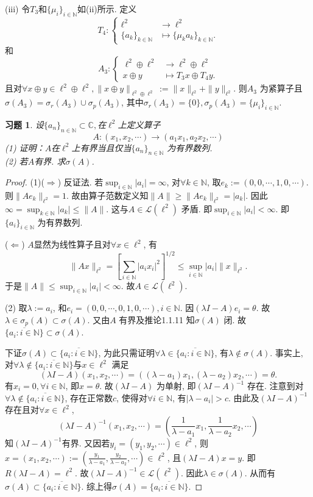 \documentclass[UTF8,twoside]{ctexbook}
\newtheorem{exercise}{习题}[section]
\newcommand{\h}{\mathscr}
\newcommand{\kx}{\mathbb}
\numberwithin{equation}{section}
\begin{document}
	(iii) 令$T_3$和$\{\mu_i\}_{i\in\kx N}$如(ii)所示. 定义
	\[
	T_4:\left\{
	\begin{aligned}
	\ell^2&\rightarrow\ell^2\\
	\{a_k\}_{k\in\kx N}&\mapsto\{\mu_k a_k\}_{k\in\kx N}.
	\end{aligned}
	\right.
	\]
	和
	\[
	A_3:\left\{
	\begin{aligned}
	\ell^2\oplus\ell^2&\rightarrow\ell^2\oplus\ell^2\\
	x\oplus y&\mapsto T_3 x\oplus T_4 y.
	\end{aligned}
	\right.
	\]
	且对$\forall x\oplus y\in\ell^2\oplus\ell^2, \|x\oplus y\|_{\ell^2\oplus\ell^2}:=\|x\|_{\ell^2}+\|y\|_{\ell^2}$. 则$A_3$ 为紧算子且$\sigma(A_3)=\sigma_r(A_3)\cup\sigma_p(A_3)$, 其中$\sigma_r(A_3)=\{0\}, \sigma_p(A_3)=\{\mu_i\}_{i\in\kx N}.$
	\begin{exercise}
		设$\{a_n\}_{n\in\kx N}\subset\kx C,$在$\ell^2$上定义算子
		\[
		A : (x_1,x_2,\cdots)\rightarrow(a_1 x_1,a_2 x_2,\cdots)
		\]
		(1) 证明：$A$在$\ell^2$上有界当且仅当$\{a_n\}_{n\in\kx N}$ 为有界数列.\\
		(2) 若$A$有界. 求$\sigma(A)$.
	\end{exercise}
	\begin{proof}
		(1)($\Rightarrow$) 反证法. 若$\sup_{i\in\kx N}|a_i|=\infty$, 对$\forall k\in\kx N$, 取$e_k:=(0,0,\cdots,1,0,\cdots)$. 则$\|Ae_k\|_{\ell^2}=1$. 故由算子范数定义知$\|A\|\geq\|Ae_k\|_{\ell^2}=|a_k|$. 因此$\infty=\sup_{k\in\kx N}|a_k|\leq\|A\|$. 这与$A\in\h L(\ell^2)$ 矛盾. 即$\sup_{i\in\kx N}|a_i|<\infty$. 即$\{a_i\}_{i\in\kx N}$ 为有界数列.

		($\Leftarrow$) $A$显然为线性算子且对$\forall x\in\ell^2$, 有
		\[
		\|Ax\|_{\ell^2}=\left[\sum_{i\in\kx N}|a_ix_i|^2\right]^{1/2}\leq\sup_{i\in\kx N}|a_i|\|x\|_{\ell^2}.
		\]
		于是$\|A\|\leq\sup_{i\in\kx N}|a_i|<\infty$. 故$A\in\h L(\ell^2)$.

		(2) 取$\lambda :=a_i$, 和$e_i=(0,0,\cdots,0,1,0,\cdots),i\in\kx N$. 因$(\lambda I-A)e_i=\theta$. 故$\lambda\in\sigma_p(A)\subset\sigma(A)$. 又由$A$ 有界及推论1.1.11 知$\sigma(A)$ 闭. 故$\overline{\{a_i:i\in\kx N\}}\subset\sigma(A)$.

		下证$\sigma(A)\subset\overline{\{a_i:i\in\kx N\}}$, 为此只需证明$\forall \lambda\in\overline{\{a_i:i\in\kx N\}}$, 有$\lambda\notin\sigma(A)$. 事实上, 对$\forall\lambda\notin\overline{\{a_i:i\in\kx N\}}$与$x\in\ell^2$ 满足
		\[
		(\lambda I-A)(x_1,x_2,\cdots)=((\lambda-a_1)x_1,(\lambda-a_2)x_2,\cdots)=\theta.
		\]
		有$x_i=0,\forall i\in\kx N$, 即$x=\theta$. 故$(\lambda I-A)$ 为单射, 即$(\lambda I-A)^{-1}$ 存在. 注意到对$\forall \lambda\notin\overline{\{a_i:i\in\kx N\}}$, 存在正常数$c$, 使得对$\forall i\in\kx N$, 有$|\lambda-a_i|>c$. 由此及$(\lambda I-A)^{-1}$ 存在且对$\forall x\in\ell^2$,
		\[
		(\lambda I-A)^{-1}(x_1,x_2,\cdots)=(\frac{1}{\lambda-a_1}x_1,\frac{1}{\lambda-a_2}x_2,\cdots)
		\]
		知$(\lambda I-A)^{-1}$有界. 又因若$y_i=(y_1,y_2,\cdots)\in\ell^2$, 则$x=(x_1,x_2,\cdots):=(\frac{y_1}{\lambda-a_1},\frac{y_2}{\lambda-a_2},\cdots)\in\ell^2$, 且$(\lambda I-A)x=y$. 即$R(\lambda I-A)=\ell^2$. 故$(\lambda I-A)^{-1}\in\h L(\ell^2)$. 因此$\lambda\in\sigma(A)$. 从而有$\sigma(A)\subset\overline{\{a_i:i\in\kx N\}}$. 综上得$\sigma(A)=\overline{\{a_i:i\in\kx N\}}$.
	\end{proof}
\end{document}
